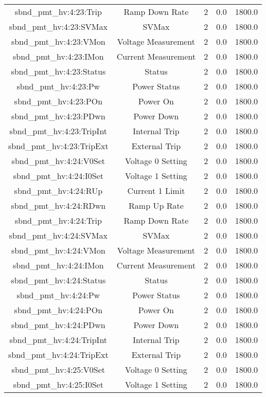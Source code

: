 \begin{center}
\begin{longtable}{c | c c c c }
sbnd\_pmt\_hv:4:23:Trip & Ramp Down Rate & 2 & 0.0 & 1800.0\\ 
sbnd\_pmt\_hv:4:23:SVMax & SVMax & 2 & 0.0 & 1800.0\\ 
sbnd\_pmt\_hv:4:23:VMon & Voltage Measurement & 2 & 0.0 & 1800.0\\ 
sbnd\_pmt\_hv:4:23:IMon & Current Measurement & 2 & 0.0 & 1800.0\\ 
sbnd\_pmt\_hv:4:23:Status & Status & 2 & 0.0 & 1800.0\\ 
sbnd\_pmt\_hv:4:23:Pw & Power Status & 2 & 0.0 & 1800.0\\ 
sbnd\_pmt\_hv:4:23:POn & Power On & 2 & 0.0 & 1800.0\\ 
sbnd\_pmt\_hv:4:23:PDwn & Power Down & 2 & 0.0 & 1800.0\\ 
sbnd\_pmt\_hv:4:23:TripInt & Internal Trip & 2 & 0.0 & 1800.0\\ 
sbnd\_pmt\_hv:4:23:TripExt & External Trip & 2 & 0.0 & 1800.0\\ 
sbnd\_pmt\_hv:4:24:V0Set & Voltage 0 Setting & 2 & 0.0 & 1800.0\\ 
sbnd\_pmt\_hv:4:24:I0Set & Voltage 1 Setting & 2 & 0.0 & 1800.0\\ 
sbnd\_pmt\_hv:4:24:RUp & Current 1 Limit & 2 & 0.0 & 1800.0\\ 
sbnd\_pmt\_hv:4:24:RDwn & Ramp Up Rate & 2 & 0.0 & 1800.0\\ 
sbnd\_pmt\_hv:4:24:Trip & Ramp Down Rate & 2 & 0.0 & 1800.0\\ 
sbnd\_pmt\_hv:4:24:SVMax & SVMax & 2 & 0.0 & 1800.0\\ 
sbnd\_pmt\_hv:4:24:VMon & Voltage Measurement & 2 & 0.0 & 1800.0\\ 
sbnd\_pmt\_hv:4:24:IMon & Current Measurement & 2 & 0.0 & 1800.0\\ 
sbnd\_pmt\_hv:4:24:Status & Status & 2 & 0.0 & 1800.0\\ 
sbnd\_pmt\_hv:4:24:Pw & Power Status & 2 & 0.0 & 1800.0\\ 
sbnd\_pmt\_hv:4:24:POn & Power On & 2 & 0.0 & 1800.0\\ 
sbnd\_pmt\_hv:4:24:PDwn & Power Down & 2 & 0.0 & 1800.0\\ 
sbnd\_pmt\_hv:4:24:TripInt & Internal Trip & 2 & 0.0 & 1800.0\\ 
sbnd\_pmt\_hv:4:24:TripExt & External Trip & 2 & 0.0 & 1800.0\\ 
sbnd\_pmt\_hv:4:25:V0Set & Voltage 0 Setting & 2 & 0.0 & 1800.0\\ 
sbnd\_pmt\_hv:4:25:I0Set & Voltage 1 Setting & 2 & 0.0 & 1800.0\\ 

\end{longtable}
\end{center}
